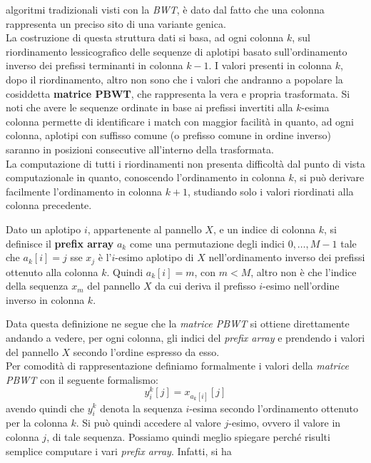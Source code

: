 algoritmi tradizionali visti con la \textit{BWT}, è dato dal fatto che una
colonna rappresenta un preciso sito di una variante genica. \\
La costruzione di questa struttura dati si basa, ad ogni colonna $k$, sul
riordinamento lessicografico delle sequenze di aplotipi basato sull'ordinamento
inverso dei prefissi terminanti in colonna $k-1$. I valori presenti in colonna
$k$, dopo il riordinamento, altro non sono che i valori che andranno a popolare
la cosiddetta \textbf{matrice PBWT}, che rappresenta la vera e propria
trasformata. Si noti che avere le sequenze 
ordinate in base ai prefissi invertiti alla $k$-esima colonna permette di
identificare i match con maggior facilità in quanto, ad ogni colonna, aplotipi
con suffisso comune (o prefisso comune in ordine inverso) saranno in posizioni
consecutive all'interno della trasformata.\\
La computazione di tutti i riordinamenti non presenta difficoltà dal punto di
vista computazionale in quanto, conoscendo l'ordinamento in colonna $k$, si può
derivare facilmente l'ordinamento in colonna $k+1$, studiando solo i valori
riordinati alla colonna precedente.
\begin{definizione}
  Dato un aplotipo $i$, appartenente al pannello $X$, e un indice di colonna
  $k$, si definisce il \textbf{prefix array} $a_k$ come una permutazione degli
  indici $0,\ldots, M-1$ tale che $a_k[i]=j$ sse $x_j$ è l'$i$-esimo aplotipo di
  $X$ nell'ordinamento inverso dei prefissi ottenuto alla colonna $k$. Quindi
  $a_k[i]=m$, con $m<M$, altro non è che l'indice della sequenza $x_m$ del
  pannello $X$ da cui deriva il prefisso $i$-esimo nell'ordine inverso
  in colonna $k$.
\end{definizione}
Data questa definizione ne segue che la \textit{matrice PBWT} si ottiene
direttamente andando a vedere, per ogni colonna, gli indici del \textit{prefix
  array} e prendendo i valori del pannello $X$ secondo l'ordine espresso da
esso.\\ 
Per comodità di rappresentazione definiamo formalmente i valori della
\textit{matrice PBWT} con il seguente formalismo:
\begin{equation}
  \label{eq:pbwty}
  y_i^k[j]=x_{a_k[i]}[j]
\end{equation}
avendo quindi che $y_i^k$ denota la sequenza $i$-esima secondo l'ordinamento
ottenuto per la colonna $k$. Si può quindi accedere al valore $j$-esimo, ovvero
il valore in colonna $j$, di tale
sequenza. Possiamo quindi meglio spiegare perché risulti 
semplice computare i vari \textit{prefix array}. Infatti, si ha
